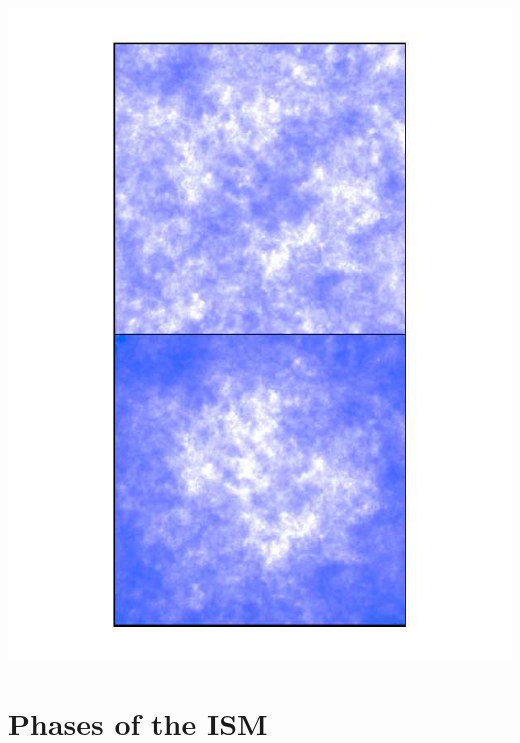 {\begin{minipage}[t]{0.49\textwidth}
\begin{center}
    \includegraphics[width=\textwidth,height=!]{./A/elmegreen_lmc_example_fig15}
\end{center}
\end{minipage}



}

\section{Phases of the ISM}


